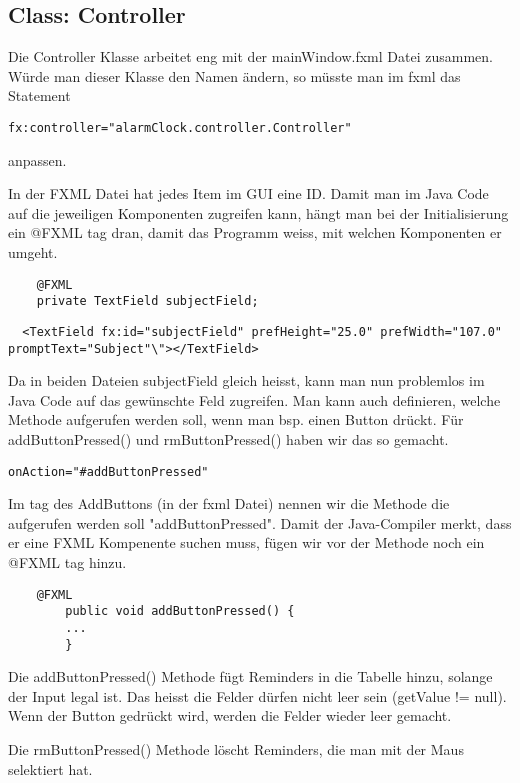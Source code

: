 \subsection{Class: Controller}
Die Controller Klasse arbeitet eng mit der mainWindow.fxml Datei zusammen. Würde man dieser Klasse den Namen ändern, so müsste man im fxml das Statement
\begin{lstlisting}
fx:controller="alarmClock.controller.Controller"
\end{lstlisting}
anpassen.

In der FXML Datei hat jedes Item im GUI eine ID. Damit man im Java Code auf die jeweiligen Komponenten zugreifen kann, hängt man bei der Initialisierung ein @FXML tag dran,
damit das Programm weiss, mit welchen Komponenten er umgeht.
\begin{lstlisting}
    @FXML
    private TextField subjectField;
\end{lstlisting}

\begin{lstlisting}
  <TextField fx:id="subjectField" prefHeight="25.0" prefWidth="107.0" promptText="Subject"\"></TextField>
\end{lstlisting}

Da in beiden Dateien subjectField gleich heisst, kann man nun problemlos im Java Code auf das gewünschte Feld zugreifen.
Man kann auch definieren, welche Methode aufgerufen werden soll, wenn man bsp. einen Button drückt. Für addButtonPressed() und rmButtonPressed() haben wir das so gemacht.

\begin{lstlisting}
onAction="#addButtonPressed"
\end{lstlisting}

Im tag des AddButtons (in der fxml Datei) nennen wir die Methode die aufgerufen werden soll "addButtonPressed". Damit der Java-Compiler merkt, dass er eine FXML Kompenente
suchen muss, fügen wir vor der Methode noch ein @FXML tag hinzu.
\begin{lstlisting}
    @FXML
        public void addButtonPressed() {
        ...
        }
\end{lstlisting}

Die addButtonPressed() Methode fügt Reminders in die Tabelle hinzu, solange der Input legal ist. Das heisst die Felder dürfen nicht leer sein (getValue != null).
Wenn der Button gedrückt wird, werden die Felder wieder leer gemacht.


Die rmButtonPressed() Methode löscht Reminders, die man mit der Maus selektiert hat.

